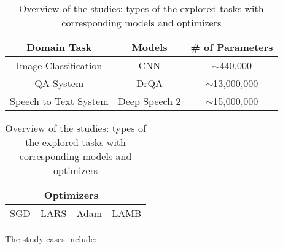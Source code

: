 \begin{table}[t]
\centering
\caption{Overview of the studies: types of the explored tasks with corresponding models and optimizers}
\label{tab:LargeBatch}
\begin{tabular}{ccc} 
 \toprule
\textbf{Domain Task} & \textbf{Models} & \textbf{\# of Parameters} \\
 \midrule
  Image Classification & CNN \cite{CNN} & $\sim$440,000 \\
  QA System & DrQA \cite{DrQA} & $\sim$13,000,000 \\ 
  Speech to Text System & Deep Speech 2 \cite{deepspeech} &  $\sim$15,000,000\\
  \bottomrule
\end{tabular}

\vspace{10pt}

\begin{tabular}{cccc} 
 \toprule
 &  \multicolumn{2}{c}{\textbf{Optimizers}} & \\
 \midrule
 SGD \cite{SGD} & LARS \cite{ginsburg2018large} & Adam \cite{adam}  &  LAMB \cite{You2020Large} \\
  \bottomrule
\end{tabular}
\end{table}

The study cases include: 

